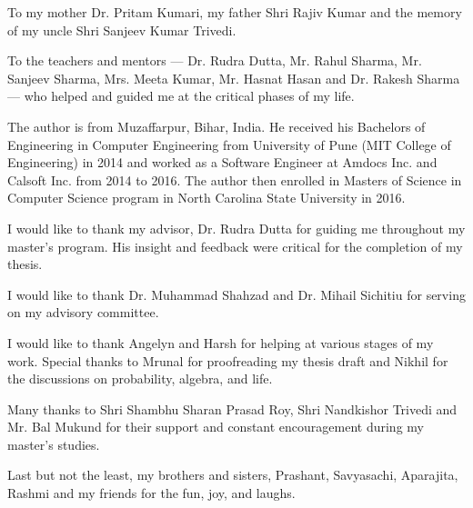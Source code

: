 \begin{dedication}
To my mother Dr. Pritam Kumari, my father Shri Rajiv Kumar and the memory of my uncle Shri Sanjeev Kumar Trivedi.


To the teachers and mentors --- Dr. Rudra Dutta, Mr. Rahul Sharma, Mr. Sanjeev Sharma, Mrs. Meeta Kumar, Mr. Hasnat Hasan and Dr. Rakesh Sharma --- who helped and guided me at the critical phases of my life.

\end{dedication}

\begin{biography}
The author is from Muzaffarpur, Bihar, India. He received his Bachelors of Engineering in Computer Engineering from University of Pune (MIT College of Engineering) in 2014 and worked as a Software Engineer at Amdocs Inc. and Calsoft Inc. from 2014 to 2016. The author then enrolled in Masters of Science in Computer Science program in North Carolina State University in 2016.
\end{biography}

\begin{acknowledgements}
I would like to thank my advisor, Dr. Rudra Dutta for guiding me throughout my master's program. His insight and feedback were critical for the completion of my thesis.

I would like to thank Dr. Muhammad Shahzad and Dr. Mihail Sichitiu for serving on my advisory committee. 

I would like to thank Angelyn and Harsh for helping at various stages of my work. Special thanks to Mrunal for proofreading my thesis draft and Nikhil for the discussions on probability, algebra, and life.

Many thanks to Shri Shambhu Sharan Prasad Roy, Shri Nandkishor Trivedi and Mr. Bal Mukund for their support and constant encouragement during my master's studies.

Last but not the least, my brothers and sisters, Prashant, Savyasachi, Aparajita, Rashmi and my friends for the fun, joy, and laughs.

\end{acknowledgements}


\thesistableofcontents

\thesislistoftables

\thesislistoffigures
